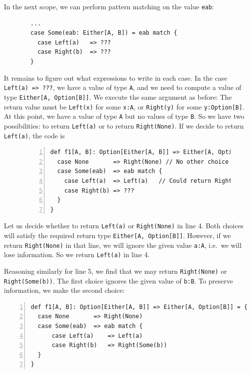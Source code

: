 In the next scope, we can perform pattern matching on the value \lstinline!eab!:

\begin{figure}%
\vspace{-0.8\baselineskip}
\begin{lstlisting}
  ...
  case Some(eab: Either[A, B]) = eab match {
    case Left(a)   => ???
    case Right(b)  => ???
  }
\end{lstlisting}

\vspace{-0.9\baselineskip}
\end{figure}%

\noindent It remains to figure out what expressions to write in each
case. In the case \lstinline!Left(a) => ???!, we have a value of
type \lstinline!A!, and we need to compute a value of type \lstinline!Either[A, Option[B]]!.
We execute the same argument as before: The return value must be \lstinline!Left(x)!
for some \lstinline!x:A!, or \lstinline!Right(y)! for some \lstinline!y:Option[B]!.
At this point, we have a value of type \lstinline!A! but no values
of type \lstinline!B!. So we have two possibilities: to return \lstinline!Left(a)!
or to return \lstinline!Right(None)!. If we decide to return \lstinline!Left(a)!,
the code is

\begin{figure}%
\vspace{-0.6\baselineskip}
\begin{lstlisting}[numbers=left]
def f1[A, B]: Option[Either[A, B]] => Either[A, Option[B]] = {
  case None       => Right(None) // No other choice here.
  case Some(eab)  => eab match {
    case Left(a)  => Left(a)   // Could return Right(None) here.
    case Right(b) => ???
  }
}
\end{lstlisting}

\vspace{-0.8\baselineskip}
\end{figure}%

\noindent Let us decide whether to return \lstinline!Left(a)! or
\lstinline!Right(None)! in line 4. Both choices will satisfy the
required return type \lstinline!Either[A, Option[B]]!. However, if
we return \lstinline!Right(None)! in that line, we will ignore the
given value \lstinline!a:A!, i.e.~we will lose information.
So we return \lstinline!Left(a)! in line 4.

Reasoning similarly for line 5, we find that we may return \lstinline!Right(None)!
or \lstinline!Right(Some(b))!. The first choice ignores the given
value of \lstinline!b:B!. To preserve information, we make the second
choice:
\begin{lstlisting}[numbers=left]
def f1[A, B]: Option[Either[A, B]] => Either[A, Option[B]] = {
  case None       => Right(None)
  case Some(eab)  => eab match {
      case Left(a)    => Left(a)
      case Right(b)   => Right(Some(b))
  }
}
\end{lstlisting}

